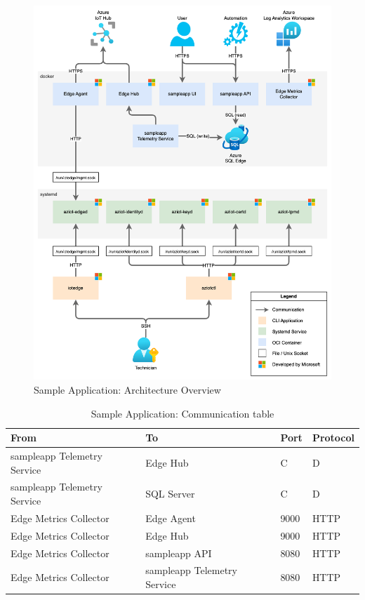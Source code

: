 \begin{figure}[H]
    \includegraphics[width=\textwidth]{fig/sample-app-dataflow.drawio.png}
    \caption{Sample Application: Architecture Overview}
    \label{fig:sample-app-architecture}
\end{figure}


\begin{table}[H]
    \centering
    \begin{tabular}{l l l l }
        \toprule
        \textbf{From} & \textbf{To} & \textbf{Port} & \textbf{Protocol} \\
        \midrule
        sampleapp Telemetry Service & Edge Hub & C & D \\
        sampleapp Telemetry Service & SQL Server & C & D \\
        Edge Metrics Collector & Edge Agent & 9000 & \ac{HTTP} \\
        Edge Metrics Collector & Edge Hub & 9000 & \ac{HTTP} \\
        Edge Metrics Collector & sampleapp API & 8080 & \ac{HTTP} \\
        Edge Metrics Collector & sampleapp Telemetry Service & 8080 & \ac{HTTP} \\
        \bottomrule
    \end{tabular}
    \caption{Sample Application: Communication table}
\end{table}

